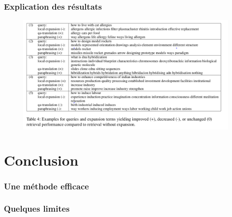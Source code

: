 \documentclass[10pt]{beamer}
\begin{document}
\begin{frame}
  \frametitle{Explication des résultats}

  \begin{figure}[h]
    \centering
    \includegraphics[width=\textwidth]{table4}
    \label{fig:res}
  \end{figure}
\end{frame}

\section{Conclusion}
\label{sec:conclusion}


\begin{frame}
  \frametitle{Une méthode efficace}
\end{frame}

\begin{frame}
  \frametitle{Quelques limites}
\end{frame}
\end{document}
